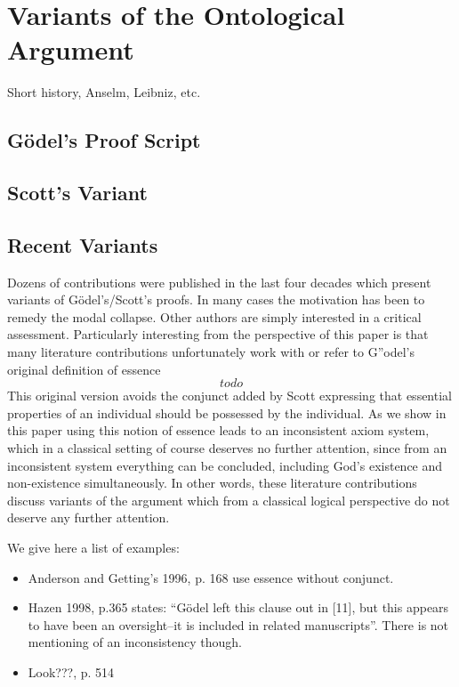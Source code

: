 \documentclass{article}
\begin{document}
\section{Variants of the Ontological Argument}
Short history, Anselm, Leibniz, etc.
\subsection{G\"{o}del's Proof Script}
\subsection{Scott's Variant}
\subsection{Recent Variants}
Dozens of contributions were published in the last four decades which
present variants of G\"odel's/Scott's proofs. In many cases the
motivation has been to remedy the modal collapse. Other authors are
simply interested in a critical assessment. Particularly interesting
from the perspective of this paper is that many literature
contributions unfortunately work with or refer to G''odel's original
definition of essence
$$ todo $$
This original version avoids the conjunct added by Scott expressing
that essential properties of an individual should be possessed by the
individual. As we show in this paper using this notion of essence
leads to an inconsistent axiom system, which in a classical setting of
course deserves no further attention, since from an inconsistent
system everything can be concluded, including God's existence and
non-existence simultaneously. In other words, these literature
contributions discuss variants of the argument which from a classical
logical perspective do not deserve any further attention.

We give here a list of examples:
\begin{itemize}
\item Anderson and Getting's 1996, p. 168 \cite[p.168]{AndersonGettings1968}
  use essence without conjunct.
\item  Hazen 1998, p.365 \cite[p.365]{Hazen1998} states: ``G\"odel left this
  clause out in [11], but this appears to have been an oversight--it
  is included in related manuscripts''. There is not mentioning of an
  inconsistency though.
\item Look???, p. 514

\end{itemize}
\end{document}
